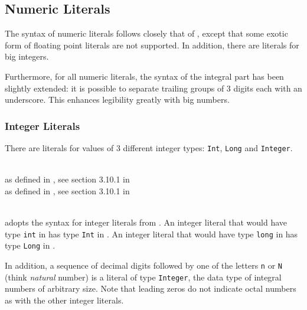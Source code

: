 \subsection{Numeric Literals}

The syntax of numeric literals follows closely that of \java{}, except that some exotic form of floating point literals are not supported.
In addition, there are literals for big integers.

Furthermore, for all numeric literals, the syntax of the integral part has been slightly extended: it is possible to separate trailing groups of 3 digits each with an underscore. This enhances legibility greatly with big numbers.


\subsubsection{Integer Literals}

There are literals for values of 3 different integer types: \texttt{Int}, \texttt{Long} and \texttt{Integer}.

\begin{flushleft}
  \oder{}  \oder{} \\
 as defined in \java{}, see section 3.10.1 in \cite{langspec3}\\
 as defined in \java{}, see section 3.10.1 in \cite{langspec3}\\
  \\
\end{flushleft}

\frege{} adopts the syntax for integer literals from \java{}. An integer literal that would have type \texttt{int} in \java{} has type \texttt{Int} in \frege{}. An integer literal that would have type \texttt{long} in \java{} has type \texttt{Long} in \frege{}.

In addition, a sequence of decimal digits followed by one of the letters \texttt{n} or \texttt{N} (think \emph{natural} number) is a literal of type \texttt{Integer}, the data type of integral numbers of arbitrary size. Note that leading zeros do not indicate octal numbers as with the other integer literals.


